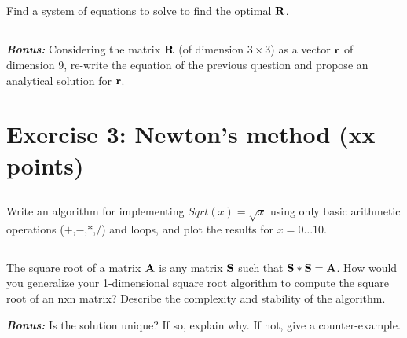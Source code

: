 \subsection{} Find a system of equations to solve to find the optimal ${\bf R}$.

\subsection{} \emph{\textbf{Bonus:}} Considering the  matrix ${\bf R}$ (of dimension $3 \times 3$) as a vector ${\bf r}$ of dimension 9, re-write the equation of the previous question and propose an analytical solution for ${\bf r}$.

\section*{Exercise 3: Newton's method \normalsize \textnormal(xx points)}

\subsection{} Write an algorithm for implementing $Sqrt(x) = \sqrt{x}$ using only basic arithmetic operations ($+$,$-$,$*$,/) and loops, and plot the results for $x=0 \hdots 10$.
\subsection{} The square root of a matrix ${\bf A}$ is any matrix ${\bf S}$ such that ${\bf S}*{\bf S}={\bf A}$. How would you generalize your 1-dimensional square root algorithm to compute the square root of an nxn matrix? Describe the complexity and stability of the algorithm.

\emph{\textbf{Bonus:}} Is the solution unique? If so, explain why. If not, give a counter-example.

